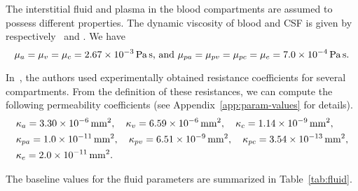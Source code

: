 \documentclass[10pt]{article}
\newcommand{\1}{^{(1)}}
\newcommand{\2}{^{(2)}}
\begin{document}
The interstitial fluid and plasma in the blood compartments are assumed to possess different properties. 
The dynamic viscosity of blood and CSF is given by respectively~\cite{Guo-2019-MPET} and \cite{bloomfield1998effects}. We have 
\[
    \mu_a = \mu_v = \mu_c = 2.67 \times 10^{-3} \, \text{\si{\pascal \second}, and }  \mu_{pa} = \mu_{pv} = \mu_{pc}  = \mu_e = 7.0 \times 10^{-4}\, \text{\si{\pascal \second}}.
\]


In~\cite{Vinje-2020-ICP}, the authors used experimentally obtained resistance coefficients for several compartments. From the definition of these resistances, we can compute the following permeability coefficients (see Appendix~\ref{app:param-values} for details). 
\[
\begin{aligned}
    &\kappa_{a} = 3.30 \times 10^{-6} \, \text{\si{mm^2}},\quad \kappa_v = 6.59\times 10^{-6} \, \text{\si{mm^2}},\quad \kappa_{c}  = 1.14\times 10^{-9} \, \text{\si{mm^2}},\\
    &\kappa_{pa} =  1.0\times 10^{-11}\, \text{\si{mm^2}},\quad \kappa_{pv} = 6.51\times 10^{-9}\, \text{\si{mm^2}},\quad \kappa_{pc}  = 3.54 \times 10^{-13}\,\text{\si{mm^2}}, \\
    &\kappa_e = 2.0\times 10^{-11} \, \text{\si{mm^2}}.
    \end{aligned}
\]

The baseline values for the fluid parameters are summarized in Table~\ref{tab:fluid}.
\end{document}
